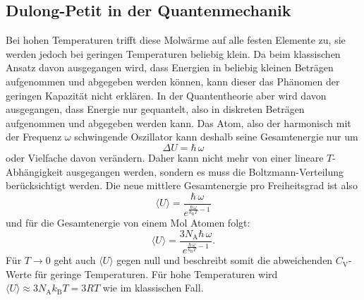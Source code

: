 \subsection{Dulong-Petit in der Quantenmechanik}
Bei hohen Temperaturen trifft diese Molwärme auf alle festen Elemente zu, sie werden jedoch bei geringen Temperaturen beliebig klein. Da beim klassischen Ansatz davon ausgegangen wird, dass Energien in beliebig kleinen Beträgen aufgenommen und abgegeben werden können, kann dieser das Phänomen der geringen Kapazität nicht erklären.\newline
In der Quantentheorie aber wird davon ausgegangen, dass Energie nur gequantelt, also in diskreten Beträgen aufgenommen und abgegeben werden kann. \newline Das Atom, also der harmonisch mit der Frequenz $\omega$ schwingende Oszillator kann deshalb seine Gesamtenergie nur um 
\begin{equation}
\Delta U=\hbar\,\omega \label{eq:deltaU}
\end{equation}
oder Vielfache davon verändern.
Daher kann nicht mehr von einer lineare $T$-Abhängigkeit ausgegangen werden, sondern es muss die Boltzmann-Verteilung berücksichtigt werden.\newline
Die neue mittlere Gesamtenergie pro Freiheitsgrad ist also \cite{V201}
\begin{equation*}
\langle U \rangle = \frac{\hbar\,\omega}{e^{\frac{\hbar\,\omega}{k_\text{B}T}-1}}
\end{equation*}
und für die Gesamtenergie von einem Mol Atomen folgt:
\begin{equation}
\langle U \rangle = \frac{3N_\text{A}\hbar\,\omega}{e^{\frac{\hbar\,\omega}{k_\text{B}T}-1}}. \label{eq:U4}
\end{equation}
Für $T\rightarrow0$ geht auch $\langle U \rangle$ gegen null und beschreibt somit die abweichenden $C_\text{V}$-Werte für geringe Temperaturen.
Für hohe Temperaturen wird $\langle U \rangle \approx 3N_\text{A}k_\text{B}T= 3RT$ wie im klassischen Fall.